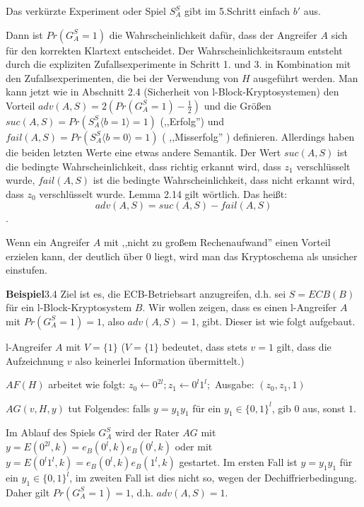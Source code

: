 \documentclass[a4paper]{article}
\begin{document}
\begin{multicols}{3}
    Das verkürzte Experiment oder Spiel $S^S_A$ gibt im 5.Schritt einfach $b'$ aus.

    Dann ist $Pr(G^S_A = 1)$ die Wahrscheinlichkeit dafür, dass der Angreifer $A$ sich für den korrekten Klartext entscheidet. Der Wahrscheinlichkeitsraum entsteht durch die expliziten Zufallsexperimente in Schritt 1. und 3. in Kombination mit den Zufallsexperimenten, die bei der Verwendung von $H$ ausgeführt werden. Man kann jetzt wie in Abschnitt 2.4 (Sicherheit von l-Block-Kryptosystemen) den Vorteil $adv(A,S) = 2(Pr(G^S_A= 1)-\frac{1}{2})$ und die Größen $suc(A,S) = Pr(S^S_A\langle b= 1\rangle = 1)$ (,,Erfolg'') und $fail(A,S) = Pr(S_A^S\langle b= 0\rangle = 1)$ ( ,,Misserfolg'' ) definieren. Allerdings haben die beiden letzten Werte eine etwas andere Semantik. Der Wert $suc(A,S)$ ist die bedingte Wahrscheinlichkeit, dass richtig erkannt wird, dass $z_1$ verschlüsselt wurde, $fail(A,S)$ ist die bedingte Wahrscheinlichkeit, dass nicht erkannt wird, dass $z_0$ verschlüsselt wurde. Lemma 2.14 gilt wörtlich. Das heißt: $$adv(A,S) = suc(A,S)-fail(A,S)$$.

    Wenn ein Angreifer $A$ mit ,,nicht zu großem Rechenaufwand'' einen Vorteil erzielen kann, der deutlich über $0$ liegt, wird man das Kryptoschema als unsicher einstufen.

    \textbf{Beispiel}3.4 Ziel ist es, die ECB-Betriebsart anzugreifen, d.h. sei $S=ECB(B)$ für ein l-Block-Kryptosystem $B$. Wir wollen zeigen, dass es einen l-Angreifer $A$ mit $Pr(G^S_A= 1) = 1$, also $adv(A,S) = 1$, gibt. Dieser ist wie folgt aufgebaut.
    \begin{itemize*}
        \item l-Angreifer $A$ mit $V=\{1\}$ ($V=\{1\}$ bedeutet, dass stets $v=1$ gilt, dass die Aufzeichnung $v$ also keinerlei Information übermittelt.)
        \item $AF(H)$ arbeitet wie folgt: $z_0\leftarrow 0^{2l}; z_1\leftarrow 0^l 1^l;$ Ausgabe: $(z_0,z_1 ,1)$
        \item $AG(v,H,y)$ tut Folgendes: falls $y=y_1y_1$ für ein $y_1\in\{0,1\}^l$, gib $0$ aus, sonst $1$.
    \end{itemize*}

    Im Ablauf des Spiels $G^S_A$ wird der Rater $AG$ mit $y=E(0^{2l},k)=e_B(0^l,k)e_B(0^l,k)$ oder mit $y=E(0^l 1^l,k)=e_B(0^l,k)e_B(1^l,k)$ gestartet. Im ersten Fall ist $y=y_1y_1$ für ein $y_1\in\{0,1\}^l$, im zweiten Fall ist dies nicht so, wegen der Dechiffrierbedingung. Daher gilt $Pr(G^S_A= 1) = 1$, d.h. $adv(A,S) = 1$.


\end{multicols}
\end{document}
